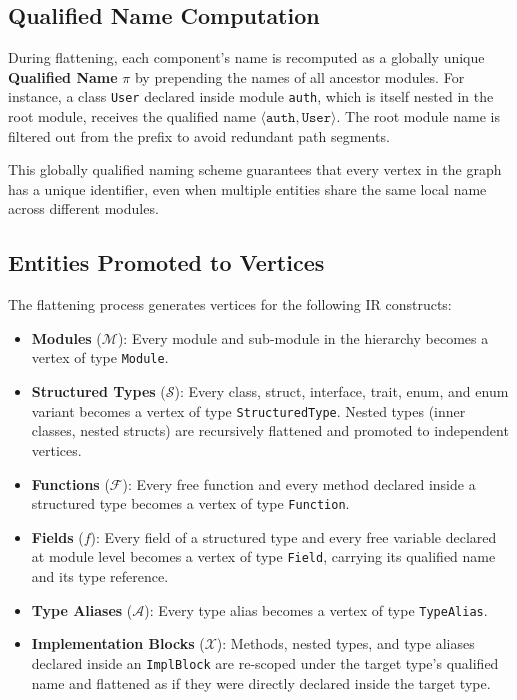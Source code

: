 \subsection{Qualified Name Computation}

During flattening, each component's name is recomputed as a globally unique \textbf{Qualified Name} $\pi$ by prepending the names of all ancestor modules. For instance, a class \texttt{User} declared inside module \texttt{auth}, which is itself nested in the root module, receives the qualified name $\langle \texttt{auth}, \texttt{User} \rangle$. The root module name is filtered out from the prefix to avoid redundant path segments.

This globally qualified naming scheme guarantees that every vertex in the graph has a unique identifier, even when multiple entities share the same local name across different modules.

\subsection{Entities Promoted to Vertices}

The flattening process generates vertices for the following IR constructs:
\begin{itemize}
  \item \textbf{Modules} ($\mathcal{M}$): Every module and sub-module in the hierarchy becomes a vertex of type \texttt{Module}.
  \item \textbf{Structured Types} ($\mathcal{S}$): Every class, struct, interface, trait, enum, and enum variant becomes a vertex of type \texttt{StructuredType}. Nested types (inner classes, nested structs) are recursively flattened and promoted to independent vertices.
  \item \textbf{Functions} ($\mathcal{F}$): Every free function and every method declared inside a structured type becomes a vertex of type \texttt{Function}.
  \item \textbf{Fields} ($f$): Every field of a structured type and every free variable declared at module level becomes a vertex of type \texttt{Field}, carrying its qualified name and its type reference.
  \item \textbf{Type Aliases} ($\mathcal{A}$): Every type alias becomes a vertex of type \texttt{TypeAlias}.
  \item \textbf{Implementation Blocks} ($\mathcal{X}$): Methods, nested types, and type aliases declared inside an \texttt{ImplBlock} are re-scoped under the target type's qualified name and flattened as if they were directly declared inside the target type.
\end{itemize}


